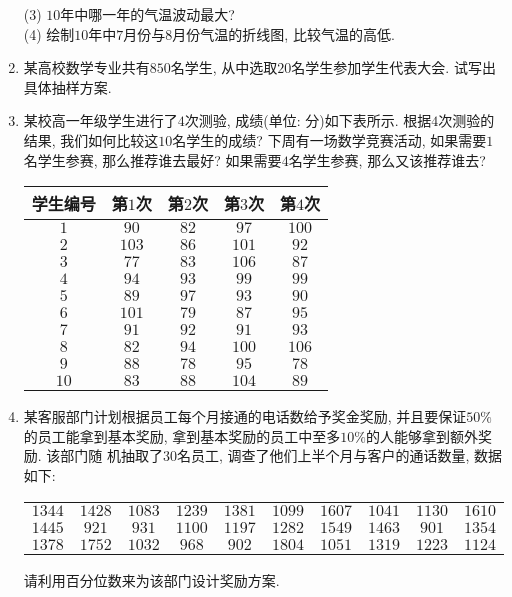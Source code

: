 \documentclass[10pt,a4paper]{article}
\begin{document}
\begin{enumerate}[1.]
(3) $10$年中哪一年的气温波动最大?\\
(4) 绘制$10$年中$7$月份与$8$月份气温的折线图, 比较气温的高低.
\vspace*{3cm}
\item 某高校数学专业共有$850$名学生, 从中选取$20$名学生参加学生代表大会. 试写出具体抽样方案.
\vspace*{3cm}
\item 某校高一年级学生进行了$4$次测验, 成绩(单位: 分)如下表所示. 根据$4$次测验的结果, 我们如何比较这$10$名学生的成绩? 下周有一场数学竞赛活动, 如果需要$1$名学生参赛, 那么推荐谁去最好? 如果需要$4$名学生参赛, 那么又该推荐谁去?
\begin{center}
    \begin{tabular}{|c|c|c|c|c|}
        \hline
        学生编号 & 第$1$次 & 第$2$次 & 第$3$次 & 第$4$次 \\ \hline
        $1$ & $90$ & $82$ & $97$ & $100$ \\ \hline
        $2$ & $103$ & $86$ & $101$ & $92$ \\ \hline
        $3$ & $77$ & $83$ & $106$ & $87$ \\ \hline
        $4$ & $94$ & $93$ & $99$ & $99$ \\ \hline 
        $5$ & $89$ & $97$ & $93$ & $90$\\ \hline
        $6$ & $101$ & $79$ & $87$ & $95$\\ \hline
        $7$ & $91$ & $92$ & $91$ & $93$ \\ \hline
        $8$ & $82$ & $94$ & $100$ & $106$ \\ \hline
        $9$ & $88$ & $78$ & $95$ & $78$ \\ \hline
        $10$ & $83$ & $88$ & $104$ & $89$ \\ \hline        
    \end{tabular}
\end{center}
\vspace*{3cm}
\item 某客服部门计划根据员工每个月接通的电话数给予奖金奖励, 并且要保证$50\%$的员工能拿到基本奖励, 拿到基本奖励的员工中至多$10\%$的人能够拿到额外奖励. 该部门随
机抽取了$30$名员工, 调查了他们上半个月与客户的通话数量, 数据如下:
\begin{center}
    \begin{tabular}{cccccccccc}
        $1344$ & $1428$ & $1083$ & $1239$ & $1381$ & $1099$ & $1607$ & $1041$ & $1130$ & $1610$ \\
        $1445$ & $921$ & $931$ & $1100$ & $1197$ & $1282$ & $1549$ & $1463$ & $901$ & $1354$ \\
        $1378$ & $1752$ & $1032$ & $968$ & $902$ & $1804$ & $1051$ & $1319$ & $1223$ & $1124$
    \end{tabular}
\end{center}
请利用百分位数来为该部门设计奖励方案.
\vspace*{3cm}
\end{enumerate}
\end{document}
